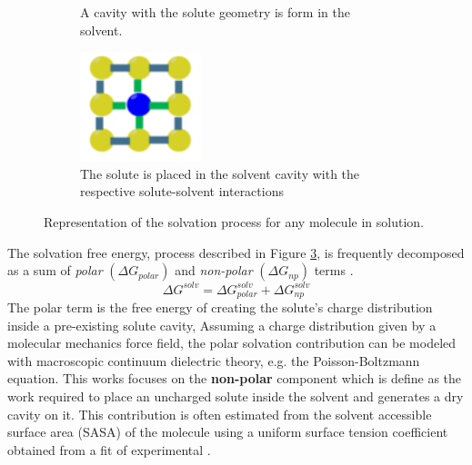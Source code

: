 \begin{figure}[h]
\begin{subfigure}[t]{0.25\textwidth}
    \caption{A cavity with the solute geometry is form in the solvent.}
    \label{fig:solv_2}
    \end{subfigure}
    \hspace{0.5cm}
    \begin{subfigure}[t]{0.25\textwidth}
    \includegraphics[width=\textwidth]{Figures/Chapter 4/Cavity_3.png}
    \caption{The solute is placed in the solvent cavity with the respective solute-solvent interactions}
    \label{fig:solv_3}
    \end{subfigure}
   
    \caption{Representation of the solvation process for any molecule in solution.}
    \label{fig:solvation}
\end{figure}
The solvation free energy, process described in Figure \ref{fig:solvation}, is frequently decomposed as a sum of \textit{polar} $(\Delta G_{polar})$ and \textit{non-polar} $(\Delta G_{np})$ terms  \cite{zacharias2003continuum}. 
\begin{equation}
    \Delta G^{solv} = \Delta G_{polar}^{solv} + \Delta G_{np}^{solv}
    \label{eq:G_solv}
\end{equation}
The polar term is the free energy of creating the solute’s charge distribution inside a pre-existing solute cavity, Assuming a charge distribution given by a molecular mechanics force field, the polar solvation contribution can be modeled with macroscopic continuum dielectric theory, e.g. the Poisson-Boltzmann equation. This works focuses on the \textbf{non-polar} component which is define as the work required to place an uncharged solute inside the solvent and generates a dry cavity on it. This contribution is often estimated from the solvent accessible surface area (SASA) of the molecule using a uniform surface tension coefficient obtained from a fit of experimental \cite{zacharias2003continuum}. 

